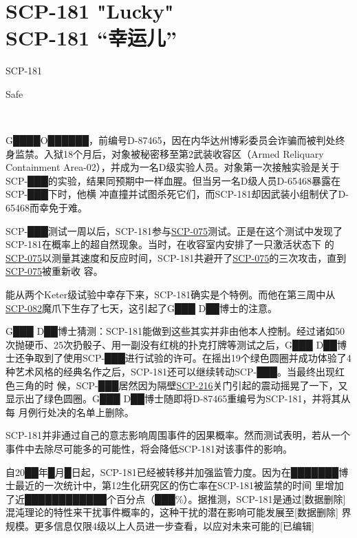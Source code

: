 \chapter[SCP-181 “幸运儿”]{
    SCP-181 "Lucky"\\
    SCP-181 “幸运儿”
}

\label{chap:SCP-181}

SCP-181

Safe


\begin{scpbox}

\\

\end{scpbox}

G████O██████，前编号D-87465，因在内华达州博彩委员会诈骗而被判处终身监禁。入狱18个月后，对象被秘密移至第2武装收容区（Armed Reliquary 
Containment Area-02），并成为一名D级实验人员。对象第一次接触实验是关于SCP-███的实验，结果同预期中一样血腥。但当另一名D级人员D-65468暴露在SCP-███下时，他横
冲直撞并试图杀死它们，而SCP-181却因武装小组制伏了D-65468而幸免于难。

SCP-███测试一周以后，SCP-181参与\hyperref[chap:SCP-075]{SCP-075}测试。正是在这个测试中发现了SCP-181在概率上的超自然现象。当时，在收容室内安排了一只激活状态下
的\hyperref[chap:SCP-075]{SCP-075}以测量其速度和反应时间，SCP-181共避开了\hyperref[chap:SCP-075]{SCP-075}的三次攻击，直到\hyperref[chap:SCP-075]{SCP-075}被重新收
容。

能从两个Keter级试验中幸存下来，SCP-181确实是个特例。而他在第三周中从\hyperref[chap:SCP-082]{SCP-082}魔爪下生存了七天，这引起了G███ D██博士的注意。

G███ D██博士猜测：SCP-181能做到这些其实并非由他本人控制。经过诸如50次抛硬币、25次扔骰子、用一副没有红桃的扑克打牌等测试之后，G███ 
D██博士还争取到了使用SCP-███进行试验的许可。在摇出19个绿色圆圈并成功体验了4种艺术风格的经典名作之后，SCP-181还可以继续转动SCP-███。当最终出现红色三角的时
候，SCP-███居然因为隔壁\hyperref[chap:SCP-216]{SCP-216}关门引起的震动摇晃了一下，又显示出了绿色圆圈。G███ D██博士随即将D-87465重编号为SCP-181，并将其从每
月例行处决的名单上删除。

SCP-181并非通过自己的意志影响周围事件的因果概率。然而测试表明，若从一个事件中去除尽可能多的可能性，将会降低SCP-181对该事件的影响。

自20██年█月█日起，SCP-181已经被转移并加强监管力度。因为在███████博士最近的一次统计中，第12生化研究区的伤亡率在SCP-181被监禁的时间
里增加了近████████████个百分点（███\%）。据推测，SCP-181是通过{[}数据删除]混沌理论的特性来干扰事件概率的，这种干扰的潜在影响可能发展至{[}数据删除]
界规模。更多信息仅限4级以上人员进一步查看，以应对未来可能的{[}已编辑]
